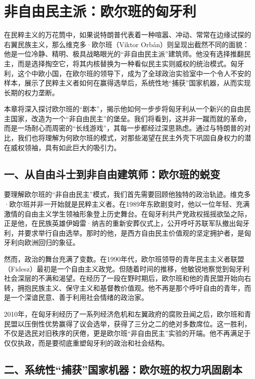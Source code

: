 \chapter{非自由民主派：欧尔班的匈牙利}

在民粹主义的万花筒中，如果说特朗普代表着一种喧嚣、冲动、常常在边缘试探的右翼民族主义，那么维克多·欧尔班（Viktor Orbán）则呈现出截然不同的面貌：他是一位冷静、精明、极具战略眼光的“非自由民主派”建筑师。他没有选择推翻民主，而是选择掏空它，将其内核替换为一种看似民主实则威权的统治模式。匈牙利，这个中欧小国，在欧尔班的领导下，成为了全球政治实验室中一个令人不安的样本，展示了民粹主义者如何在赢得选举后，系统性地“捕获”国家机器，从而实现长期的权力垄断。

本章将深入探讨欧尔班的“剧本”，揭示他如何一步步将匈牙利从一个新兴的自由民主国家，改造为一个“非自由民主”的堡垒。我们将看到，这并非一蹴而就的革命，而是一场耐心而周密的“长线游戏”，其每一步都经过深思熟虑。通过与特朗普的对比，我们也将理解为何欧尔班的模式，对那些渴望在民主外壳下巩固自身权力的潜在威权领袖，具有如此巨大的吸引力。

\section{一、从自由斗士到非自由建筑师：欧尔班的蜕变}

要理解欧尔班的“非自由民主”模式，我们首先需要回顾他独特的政治轨迹。维克多·欧尔班并非一开始就是民粹主义者。在1989年东欧剧变时，他以一位年轻、充满激情的自由主义学生领袖形象登上历史舞台。在匈牙利共产党政权摇摇欲坠之际，正是他，在民族英雄伊姆雷·纳吉的重新安葬仪式上，公开呼吁苏联军队撤出匈牙利，并要求举行自由选举。那时的他，是西方自由民主价值观的坚定拥护者，是匈牙利向欧洲回归的象征。

然而，政治的舞台充满了变数。在1990年代，欧尔班领导的青年民主主义者联盟（Fidesz）最初是一个自由主义政党。但随着时间的推移，他敏锐地察觉到匈牙利社会深层的不满和渴望。在经历了一段在野时期后，欧尔班和他的青民盟开始向右转，拥抱民族主义、保守主义和基督教价值观。他不再是那个呼吁自由的青年，而是一个深谙民意、善于利用社会情绪的政治家。

2010年，在匈牙利经历了一系列经济危机和左翼政府的腐败丑闻之后，欧尔班和青民盟以压倒性优势赢得了议会选举，获得了三分之二的绝对多数席位。这一胜利，不仅是选民对旧秩序的厌倦，更是欧尔班“非自由民主”实验的开端。他不再满足于仅仅执政，而是要彻底重塑匈牙利的政治和社会结构。

\section{二、系统性“捕获”国家机器：欧尔班的权力巩固剧本}

